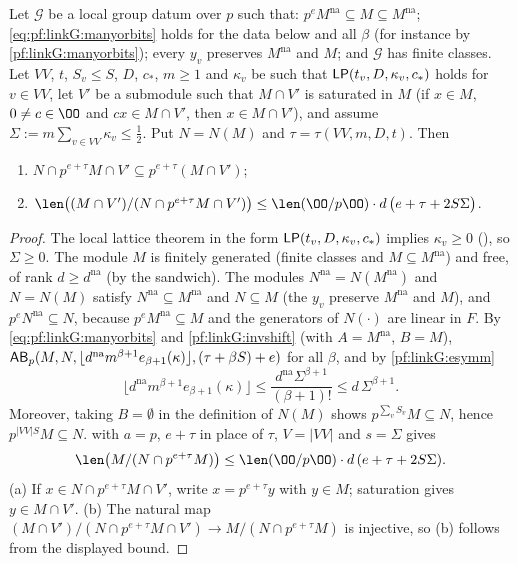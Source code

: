\begin{proposition}\label{pf:linkG:core}
Let $\mathcal G$ be a local group datum over $p$ such that: $p^eM^{\mathrm{na}}\subseteq M\subseteq M^{\mathrm{na}}$;
\eqref{eq:pf:linkG:manyorbits} holds for the data below and all $\beta$ (for instance by \cref{pf:linkG:manyorbits}); every
$y_v$ preserves $M^{\mathrm{na}}$ and $M$; and $\mathcal G$ has finite classes. Let
$VV$, $t$, $S_v\le S$, $D$, $c_*$, $m\ge1$ and $\kappa_v$ be such that $\mathsf{LP}(t_v,D,\kappa_v,c_*)$ holds for $v\in VV$,
let $V'$ be a submodule such that $M\cap V'$ is saturated in $M$ (if $x\in M$, $0\ne c\in\OO$ and $cx\in M\cap V'$, then
$x\in M\cap V'$), and assume $\Sigma:=m\sum_{v\in VV}\kappa_v\le\frac12$. Put $N=N(M)$ and $\tau=\tau(VV,m,D,t)$. Then
\begin{enumerate}[label=(\alph*)]
\item $N\cap p^{e+\tau}M\cap V'\subseteq p^{e+\tau}(M\cap V')$;
\item $\len\bigl((M\cap V')/(N\cap p^{e+\tau}M\cap V')\bigr)\le\len(\OO/p\OO)\cdot d\,\bigl(e+\tau+2S\Sigma\bigr)$.
\end{enumerate}
\end{proposition}

\begin{proof}
The local lattice theorem in the form $\mathsf{LP}(t_v,D,\kappa_v,c_*)$ implies $\kappa_v\ge0$
(), so $\Sigma\ge0$. The module $M$ is finitely
generated (finite classes and $M\subseteq M^{\mathrm{na}}$) and free, of rank $d\ge d^{\mathrm{na}}$ (by the sandwich).
The modules $N^{\mathrm{na}}=N(M^{\mathrm{na}})$ and $N=N(M)$ satisfy $N^{\mathrm{na}}\subseteq M^{\mathrm{na}}$ and
$N\subseteq M$ (the $y_v$ preserve $M^{\mathrm{na}}$ and $M$), and $p^eN^{\mathrm{na}}\subseteq N$, because
$p^eM^{\mathrm{na}}\subseteq M$ and the generators of $N(\cdot)$ are linear in $F$. By \eqref{eq:pf:linkG:manyorbits} and
\cref{pf:linkG:invshift} (with $A=M^{\mathrm{na}}$, $B=M$),
$\mathsf{AB}_p(M,N,\lfloor d^{\mathrm{na}}m^{\beta+1}e_{\beta+1}(\kappa)\rfloor,(\tau+\beta S)+e)$ for all $\beta$, and by
\cref{pf:linkG:esymm}
\[
\lfloor d^{\mathrm{na}}m^{\beta+1}e_{\beta+1}(\kappa)\rfloor\le\frac{d^{\mathrm{na}}\Sigma^{\beta+1}}{(\beta+1)!}\le d\,\Sigma^{\beta+1}.
\]
Moreover, taking $B=\emptyset$ in the definition of $N(M)$ shows $p^{\sum_vS_v}M\subseteq N$, hence
$p^{|VV|S}M\subseteq N$.  with $a=p$, $e+\tau$ in place of $\tau$, $V=|VV|$ and $s=\Sigma$
gives
\[
\len\bigl(M/(N\cap p^{e+\tau}M)\bigr)\le\len(\OO/p\OO)\cdot d\,(e+\tau+2S\Sigma).
\]
(a) If $x\in N\cap p^{e+\tau}M\cap V'$, write $x=p^{e+\tau}y$ with $y\in M$; saturation gives $y\in M\cap V'$. (b) The
natural map $(M\cap V')/(N\cap p^{e+\tau}M\cap V')\to M/(N\cap p^{e+\tau}M)$ is injective, so (b) follows from the
displayed bound.
\end{proof}

